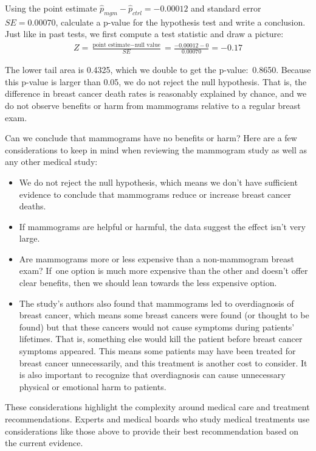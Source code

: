 \begin{examplewrap}
\begin{nexample}{Using the point estimate $\hat{p}_{mgm} - \hat{p}_{ctrl} = -0.00012$ and standard error $SE = 0.00070$, calculate a p-value for the hypothesis test and write a conclusion.}
Just like in past tests, we first compute a test statistic and draw a picture:
\begin{align*}
Z = \frac{\text{point estimate} - \text{null value}}{SE}
	= \frac{-0.00012 - 0}{0.00070}
	= -0.17
\end{align*}
\begin{center}
\end{center}
The lower tail area is 0.4325, which we double to get the p-value:~0.8650. Because this p-value is larger than 0.05, we do not reject the null hypothesis. That is, the difference in breast cancer death rates is reasonably explained by chance, and we do not observe benefits or harm from mammograms relative to a regular breast exam.
\end{nexample}
\end{examplewrap}

Can we conclude that mammograms have no benefits or harm?
Here are a few considerations to keep in mind when reviewing
the mammogram study as well as any other medical study:
\begin{itemize}
\setlength{\itemsep}{0mm}
\item
    We do not reject the null hypothesis, which means
    we don't have sufficient evidence to conclude that
    mammograms reduce or increase breast cancer deaths.
\item
    If mammograms are helpful or harmful, the data
    suggest the effect isn't very large.
\item
    Are mammograms more or less expensive than
    a non-mammogram breast exam?
    If~one option is much more expensive than the
    other and doesn't offer clear benefits,
    then we should lean towards the less expensive
    option.
\item
    The study's authors also found that mammograms
    led to overdiagnosis of breast cancer,
    which means some breast cancers were found
    (or thought to be found) but that these cancers
    would not cause symptoms during patients' lifetimes.
    That is, something else would kill the patient
    before breast cancer symptoms appeared.
    This means some patients may have been treated
    for breast cancer unnecessarily, and this
    treatment is another cost to consider.
    It is also important to recognize that
    overdiagnosis can cause unnecessary physical
    or emotional harm to patients.
\end{itemize}
These considerations highlight the complexity around medical care and treatment recommendations. Experts and medical boards who study medical treatments use considerations like those above to provide their best recommendation based on the current evidence.

